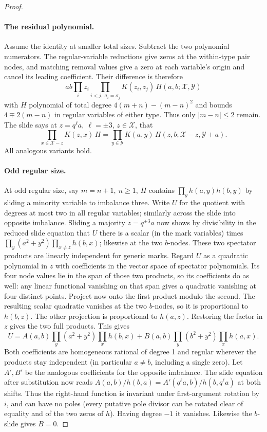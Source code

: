 \begin{proof}
\paragraph{The residual polynomial.}
Assume the identity at smaller total sizes. Subtract the two polynomial
numerators. The regular-variable reductions give zeros at the within-type
pair nodes, and matching removal values give a zero at each variable's
origin and cancel its leading coefficient. Their difference is therefore
\[
 ab\prod_i z_i\prod_{i<j,\ \sigma_i=\sigma_j} K(z_i,z_j)\,H(a,b;\mathcal X,\mathcal Y)
\]
with \(H\) polynomial of total degree \(4(m+n)-(m-n)^2\) and bounds \(4\mp2(m-n)\) in regular variables of either type. Thus only \(|m-n|\le2\) remain. The slide says at \(z=q^{\ell}a,\ \ell=\pm3\), \(z\in\mathcal X\), that
\[
 \prod_{x\in\mathcal X-z}K(z,x)\,H=\prod_{y\in\mathcal Y}K(a,y)\,
                    H(z,b;\mathcal X-z,\mathcal Y+a).
\]
All analogous variants hold.

\paragraph{Odd regular size.}
At odd regular size, say \(m=n+1,\ n\ge1\), \(H\) contains \(\prod_{y}h(a,y)h(b,y)\) by sliding a minority variable to imbalance three. Write \(U\) for the quotient with degrees at most two in all regular variables; similarly across the slide into opposite imbalance. Sliding a majority \(z=q^{\pm3}a\) now shows by divisibility in the reduced slide equation that \(U\) there is a scalar (in the mark variables) times \(\prod_y(a^2+y^2)\prod_{x\ne z}h(b,x)\); likewise at the two \(b\)-nodes. These two spectator products are linearly independent for generic
marks. Regard $U$ as a quadratic polynomial in $z$ with coefficients in
the vector space of spectator polynomials. Its four node values lie in
the span of those two products, so its coefficients do as well: any
linear functional vanishing on that span gives a quadratic vanishing at
four distinct points. Project now onto the first product modulo the
second. The resulting scalar quadratic vanishes at the two $b$-nodes,
so it is proportional to $h(b,z)$. The other projection is proportional
to $h(a,z)$. Restoring the factor in $z$ gives the two full products. This gives
\[
 U=A(a,b)\prod_y(a^2+y^2)\prod_x h(b,x)+B(a,b)\prod_y(b^2+y^2)\prod_x h(a,x).
\]
Both coefficients are homogeneous rational of degree 1 and regular wherever the products stay independent (in particular \(a\ne b\), including a single zero). Let \(A',B'\) be the analogous coefficients for the opposite imbalance. The slide equation after substitution now reads \(A(a,b)/h(b,a)=A'(q^\ell a,b)/h(b,q^\ell a)\) at both shifts. Thus the right-hand function is invariant under first-argument rotation by \(i\), and can have no poles (every putative pole divisor can be rotated clear of equality and of the two zeros of \(h\)). Having degree \(-1\) it vanishes. Likewise the \(b\)-slide gives \(B=0\).


\end{proof}
